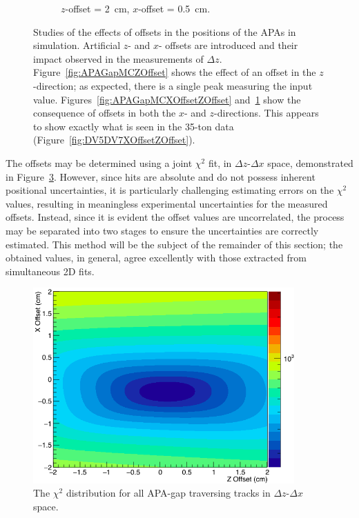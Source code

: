 \begin{figure}
\begin{subfigure}[t]{\linewidth}
    \caption{$z$-offset = 2~cm, $x$-offset = 0.5~cm.}
    \label{fig:APAGapMCXOffsetZOffsetAngle}
  \end{subfigure}
  \caption[Studies of the effects of offsets in the positions of the APAs in simulation.]{Studies of the effects of offsets in the positions of the APAs in simulation.  Artificial $z$- and $x$- offsets are introduced and their impact observed in the measurements of $\Delta z$.  Figure~\ref{fig:APAGapMCZOffset} shows the effect of an offset in the $z$-direction; as expected, there is a single peak measuring the input value.  Figures~\ref{fig:APAGapMCXOffsetZOffset} and~\ref{fig:APAGapMCXOffsetZOffsetAngle} show the consequence of offsets in both the $x$- and $z$-directions.  This appears to show exactly what is seen in the 35-ton data (Figure~\ref{fig:DV5DV7XOffsetZOffset}).}
  \label{fig:APAGapMC}
\end{figure}

The offsets may be determined using a joint $\chi^2$ fit, in $\Delta z$-$\Delta x$ space, demonstrated in Figure~\ref{fig:DV5DV7CombinedOffsets}.  However, since hits are absolute and do not possess inherent positional uncertainties, it is particularly challenging estimating errors on the $\chi^2$ values, resulting in meaningless experimental uncertainties for the measured offsets.  Instead, since it is evident the offset values are uncorrelated, the process may be separated into two stages to ensure the uncertainties are correctly estimated.  This method will be the subject of the remainder of this section; the obtained values, in general, agree excellently with those extracted from simultaneous 2D fits.

\begin{figure}
  \centering
  \includegraphics[width=10cm]{TPC5TPC7CombinedOffsets.png}
  \caption[The $\chi^2$ distribution for all APA-gap traversing tracks in $\Delta z$-$\Delta x$ space.]{The $\chi^2$ distribution for all APA-gap traversing tracks in $\Delta z$-$\Delta x$ space.}
  \label{fig:DV5DV7CombinedOffsets}
\end{figure}

